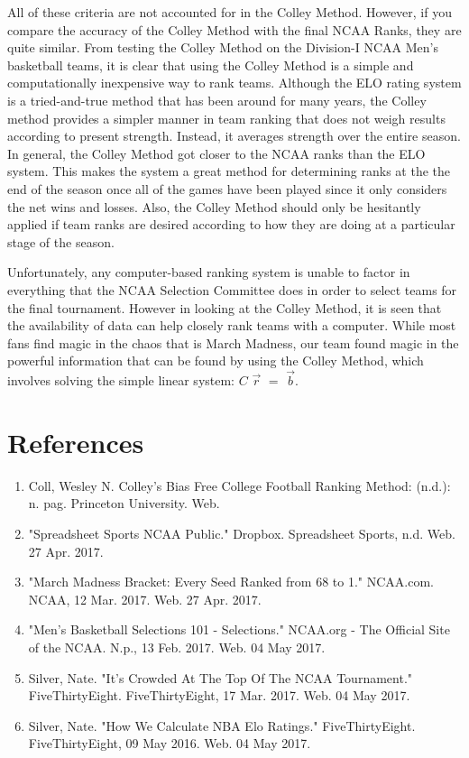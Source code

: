 \documentclass{article}
\begin{document}
All of these criteria are not accounted for in the Colley Method. However, if you compare the accuracy of the Colley Method with the final NCAA Ranks, they are quite similar. From testing the Colley Method on the Division-I NCAA Men's basketball teams, it is clear that using the Colley Method is a simple and computationally inexpensive way to rank teams. Although the ELO rating system is a tried-and-true method that has been around for many years, the Colley method provides a simpler manner in team ranking that does not weigh results according to present strength. Instead, it averages strength over the entire season. In general, the Colley Method got closer to the NCAA ranks than the ELO system. This makes the system a great method for determining ranks at the the end of the season once all of the games have been played since it only considers the net wins and losses. Also, the Colley Method should only be hesitantly applied if team ranks are desired according to how they are doing at a particular stage of the season.

Unfortunately, any computer-based ranking system is unable to factor in everything that the NCAA Selection Committee does in order to select teams for the final tournament. However in looking at the Colley Method, it is seen that the availability of data can help closely rank teams with a computer. While most fans find magic in the chaos that is March Madness, our team found magic in the powerful information that can be found by using the Colley Method, which involves solving the simple linear system: $C$ $\vec{r}$ $=$ $\vec{b}$.

\newpage
\section{References}
\begin{enumerate}
\item Coll, Wesley N. Colley’s Bias Free College Football Ranking Method: (n.d.): n. pag. Princeton University. Web.
\item "Spreadsheet Sports NCAA Public." Dropbox. Spreadsheet Sports, n.d. Web. 27 Apr. 2017.
\item "March Madness Bracket: Every Seed Ranked from 68 to 1." NCAA.com. NCAA, 12 Mar. 2017. Web. 27 Apr. 2017.
\item "Men's Basketball Selections 101 - Selections." NCAA.org - The Official Site of the NCAA. N.p., 13 Feb. 2017. Web. 04 May 2017.
\item Silver, Nate. "It's Crowded At The Top Of The NCAA Tournament." FiveThirtyEight. FiveThirtyEight, 17 Mar. 2017. Web. 04 May 2017.
\item Silver, Nate. "How We Calculate NBA Elo Ratings." FiveThirtyEight. FiveThirtyEight, 09 May 2016. Web. 04 May 2017.
\end{enumerate}
\newpage
\end{document}
